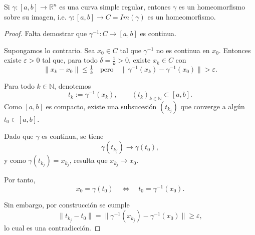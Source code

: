 
\begin{observación}
Si $\gamma: [a,b] \to \mathbb{R}^n$ es una curva simple regular, entones $\gamma$ es un homeomorfismo sobre su imagen, i.e. $\gamma: [a, b] \to C = Im(\gamma)$ es un homeomorfismo. 
\end{observación}

\begin{proof}
    Falta demostrar que $\gamma^{-1} : C \to [a,b]$ es continua.  

    Supongamos lo contrario. Sea $x_0 \in C$ tal que $\gamma^{-1}$ no es continua en $x_0$.  
    Entonces existe $\varepsilon > 0$ tal que, para todo $\delta = \tfrac{1}{k} > 0$,  
    existe $x_k \in C$ con
    \[
        \|x_k - x_0\| \leq \tfrac{1}{k}
        \quad \text{pero} \quad
        \|\gamma^{-1}(x_k) - \gamma^{-1}(x_0)\| > \varepsilon.
    \]
    
    Para todo $k \in \mathbb{N}$, denotemos
    \[
        t_k := \gamma^{-1}(x_k), \qquad (t_k)_{k \in \mathbb{N}} \subset [a,b].
    \]
    Como $[a,b]$ es compacto, existe una subsucesión $(t_{k_j})$ que converge a algún
    $t_0 \in [a,b]$.  
    
    Dado que $\gamma$ es continua, se tiene
    \[
        \gamma(t_{k_j}) \to \gamma(t_0),
    \]
    y como $\gamma(t_{k_j}) = x_{k_j}$, resulta que $x_{k_j} \to x_0$.  
    
    Por tanto,
    \[
        x_0 = \gamma(t_0) \quad \iff \quad t_0 = \gamma^{-1}(x_0).
    \]
    
    Sin embargo, por construcción se cumple
    \[
        \|t_{k_j} - t_0\| 
        = \|\gamma^{-1}(x_{k_j}) - \gamma^{-1}(x_0)\|
        \geq \varepsilon,
    \]
    lo cual es una contradicción.    
\end{proof}

